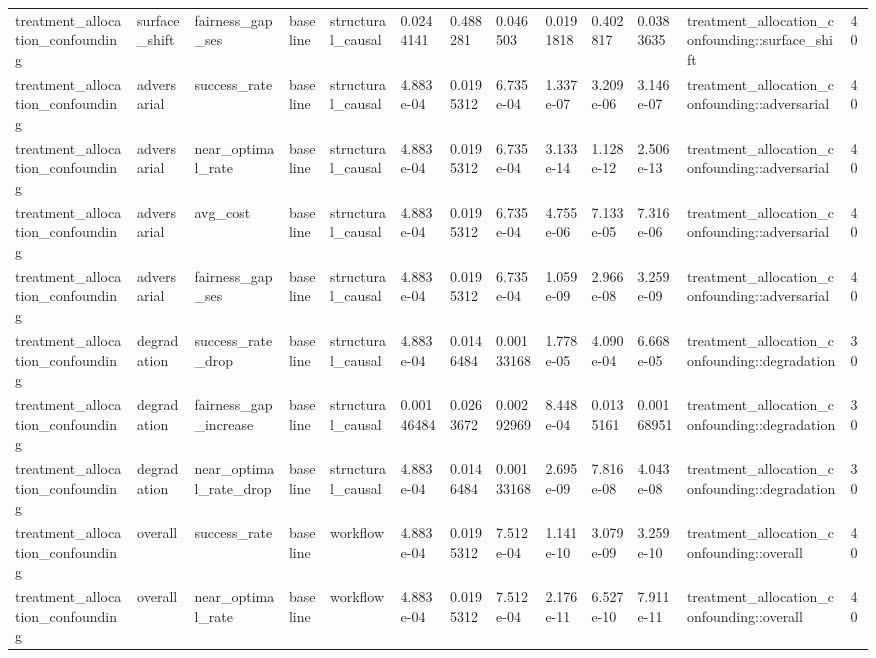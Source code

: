 \begin{tabular}{lllllllllllll}
treatment\_allocation\_confounding & surface\_shift & fairness\_gap\_ses & baseline & structural\_causal & 0.0244141 & 0.488281 & 0.046503 & 0.0191818 & 0.402817 & 0.0383635 & treatment\_allocation\_confounding::surface\_shift & 40 \\
treatment\_allocation\_confounding & adversarial & success\_rate & baseline & structural\_causal & 4.883e-04 & 0.0195312 & 6.735e-04 & 1.337e-07 & 3.209e-06 & 3.146e-07 & treatment\_allocation\_confounding::adversarial & 40 \\
treatment\_allocation\_confounding & adversarial & near\_optimal\_rate & baseline & structural\_causal & 4.883e-04 & 0.0195312 & 6.735e-04 & 3.133e-14 & 1.128e-12 & 2.506e-13 & treatment\_allocation\_confounding::adversarial & 40 \\
treatment\_allocation\_confounding & adversarial & avg\_cost & baseline & structural\_causal & 4.883e-04 & 0.0195312 & 6.735e-04 & 4.755e-06 & 7.133e-05 & 7.316e-06 & treatment\_allocation\_confounding::adversarial & 40 \\
treatment\_allocation\_confounding & adversarial & fairness\_gap\_ses & baseline & structural\_causal & 4.883e-04 & 0.0195312 & 6.735e-04 & 1.059e-09 & 2.966e-08 & 3.259e-09 & treatment\_allocation\_confounding::adversarial & 40 \\
treatment\_allocation\_confounding & degradation & success\_rate\_drop & baseline & structural\_causal & 4.883e-04 & 0.0146484 & 0.00133168 & 1.778e-05 & 4.090e-04 & 6.668e-05 & treatment\_allocation\_confounding::degradation & 30 \\
treatment\_allocation\_confounding & degradation & fairness\_gap\_increase & baseline & structural\_causal & 0.00146484 & 0.0263672 & 0.00292969 & 8.448e-04 & 0.0135161 & 0.00168951 & treatment\_allocation\_confounding::degradation & 30 \\
treatment\_allocation\_confounding & degradation & near\_optimal\_rate\_drop & baseline & structural\_causal & 4.883e-04 & 0.0146484 & 0.00133168 & 2.695e-09 & 7.816e-08 & 4.043e-08 & treatment\_allocation\_confounding::degradation & 30 \\
treatment\_allocation\_confounding & overall & success\_rate & baseline & workflow & 4.883e-04 & 0.0195312 & 7.512e-04 & 1.141e-10 & 3.079e-09 & 3.259e-10 & treatment\_allocation\_confounding::overall & 40 \\
treatment\_allocation\_confounding & overall & near\_optimal\_rate & baseline & workflow & 4.883e-04 & 0.0195312 & 7.512e-04 & 2.176e-11 & 6.527e-10 & 7.911e-11 & treatment\_allocation\_confounding::overall & 40 \\

\end{tabular}
